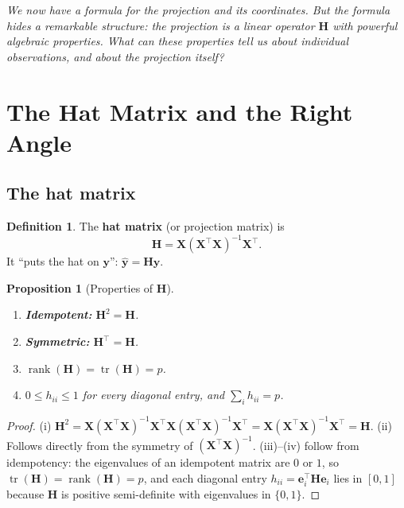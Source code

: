 \documentclass[11pt,a4paper]{article}
\theoremstyle{plain}
\newtheorem{proposition}[theorem]{Proposition}
\theoremstyle{definition}
\newtheorem{definition}[theorem]{Definition}
\newcommand{\yhat}{\hat{\bm{y}}}
\newcommand{\bX}{\bm{X}}
\newcommand{\by}{\bm{y}}
\newcommand{\bH}{\bm{H}}
\DeclareMathOperator{\tr}{tr}
\DeclareMathOperator{\rank}{rank}
\begin{document}
\medskip
\noindent\textit{We now have a formula for the projection and its
coordinates.
But the formula hides a remarkable structure: the projection is a
\emph{linear operator} $\bH$ with powerful algebraic properties.
What can these properties tell us about individual observations,
and about the projection itself?}


\section{The Hat Matrix and the Right Angle}\label{sec:hat}

\subsection{The hat matrix}

\begin{definition}
The \textbf{hat matrix} (or projection matrix) is
\[
  \bH = \bX(\bX^\top\bX)^{-1}\bX^\top.
\]
It ``puts the hat on $\by$'': $\yhat = \bH\by$.
\end{definition}

\begin{proposition}[Properties of $\bH$]\label{prop:hat}
\leavevmode
\begin{enumerate}[nosep,label=(\roman*)]
  \item \textbf{Idempotent:} $\bH^2 = \bH$.
  \item \textbf{Symmetric:} $\bH^\top = \bH$.
  \item $\rank(\bH) = \tr(\bH) = p$.
  \item $0 \le h_{ii} \le 1$ for every diagonal entry,
        and $\sum_i h_{ii} = p$.
\end{enumerate}
\end{proposition}

\begin{proof}
(i) $\bH^2 = \bX(\bX^\top\bX)^{-1}\bX^\top
\bX(\bX^\top\bX)^{-1}\bX^\top = \bX(\bX^\top\bX)^{-1}\bX^\top = \bH$.
(ii) Follows directly from the symmetry of
$(\bX^\top\bX)^{-1}$.
(iii)--(iv) follow from idempotency: the eigenvalues of an idempotent
matrix are $0$ or $1$, so $\tr(\bH)=\rank(\bH)=p$, and each diagonal
entry $h_{ii}=\bm{e}_i^\top\bH\bm{e}_i$ lies in $[0,1]$ because $\bH$ is
positive semi-definite with eigenvalues in $\{0,1\}$.
\end{proof}
\end{document}
